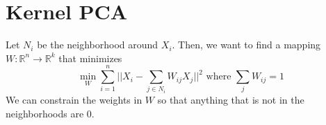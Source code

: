 \section{Kernel PCA}

  \begin{definition}
    \label{def:kernel-pca}
    Let $N_i$ be the neighborhood around $X_i$. Then, we want to find a mapping $W: \mathbb{R}^n \rightarrow \mathbb{R}^k$ that minimizes 
    \begin{equation}
      \min_{W} \sum_{i=1}^n \bigg| \bigg| X_i - \sum_{j \in N_i} W_{ij} X_j \bigg| \bigg|^2 \text{ where } \sum_{j} W_{ij} = 1
    \end{equation}
    We can constrain the weights in $W$ so that anything that is not in the neighborhoods are $0$. 
  \end{definition}

